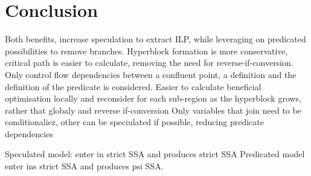 \section{Conclusion}
Both benefits, increase speculation to extract ILP, while leveraging on predicated possibilities to remove branches.
Hyperblock formation is more conservative, critical path is easier to calculate, removing the need for reverse-if-conversion. Only control flow dependencies between a confluent point, a definition and the definition of the predicate is considered. 
Easier to calculate beneficial optimisation locally and reconsider for each sub-region as the hyperblock grows, rather that globaly and reverse if-conversion
Only variables that join need to be conditionaliez, other can be speciulated if possible, reducing predicate dependencies

Speculated model: enter in strict SSA and produces strict SSA
Predicated model enter ins strict SSA and produces psi SSA.




